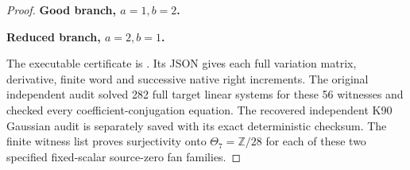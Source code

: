 \begin{proof}
\par

\medskip\noindent\textbf{Good branch, \(a=1,b=2\).}


\clearpage
\par

\medskip\noindent\textbf{Reduced branch, \(a=2,b=1\).}


The executable certificate is
. Its JSON gives each
full variation matrix, derivative, finite word and successive native
right increments. The original independent audit solved 282 full
target linear systems for these 56 witnesses and checked every
coefficient-conjugation equation. The recovered independent K90
Gaussian audit is separately saved with its exact deterministic
checksum. The finite witness list proves surjectivity onto
\(\Theta_7=\mathbb Z/28\) for each of these two specified
fixed-scalar source-zero fan families.

\end{proof}